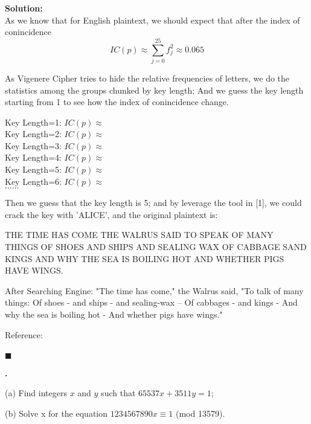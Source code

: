 \documentclass{article}
\newcounter{pcounter}                                   %
\newenvironment{problem}                                %
{                                                       %
    \stepcounter{pcounter}                              %
    \textbf{\arabic{pcounter}.}                         %
}{}                                                     %
\newenvironment{solution}                               %
{\textbf{Solution:} \\}{$\blacksquare$\newline}         %
\begin{document}
    \begin{solution}
        As we know that for English plaintext, we should expect that after the  
        index of conincidence
        $$
            IC(p) \approx \sum\limits_{j=0}^{25} f_{j}^2 \approx 0.065
        $$

        As Vigenere Cipher tries to hide the relative frequencies of letters, we do the statistics among the groups chunked by key length; And we guess the key length starting from 1 to see how the index of conincidence change.

        Key Length=1: $IC(p) \approx$ \\
        Key Length=2: $IC(p) \approx$ \\
        Key Length=3: $IC(p) \approx$ \\
        Key Length=4: $IC(p) \approx$ \\
        Key Length=5: $IC(p) \approx$ \\
        Key Length=6: $IC(p) \approx$ \\
        $\dots \dots$

        Then we guess that the key length is 5; and by leverage the tool in [1], we could crack the key with 'ALICE', and the original plaintext is:

        THE TIME HAS COME THE WALRUS SAID TO SPEAK OF MANY THINGS OF SHOES AND SHIPS AND SEALING WAX OF CABBAGE SAND KINGS AND WHY THE SEA IS BOILING HOT AND WHETHER PIGS HAVE WINGS.

        After Searching Engine: "The time has come," the Walrus said, "To talk of many things: Of shoes - and ships - and sealing-wax -- Of cabbages - and kings - And why the sea is boiling hot - And whether pigs have wings."

        Reference: \\
         \\
    \end{solution}

    \begin{problem}
        (a) Find integers $x$ and $y$ such that $65537x+3511y=1$;
        
        (b) Solve x for the equation $1234567890x \equiv 1$ (mod 13579).
    \end{problem}
    
\end{document}
